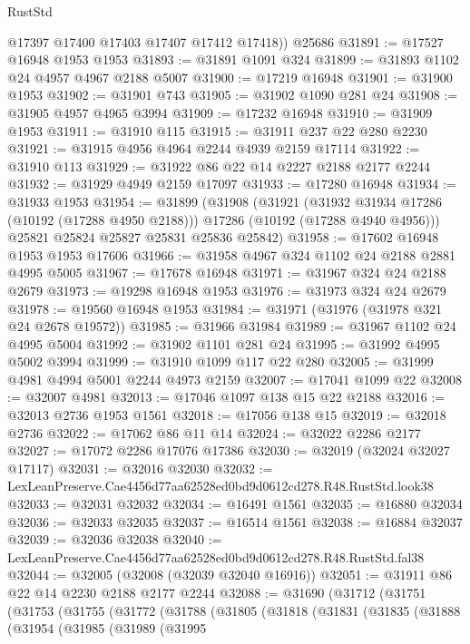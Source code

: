 \begin{lexlean}{RustStd}
\begin{coremodule}
        @17397
        @17400
        @17403
        @17407
        @17412
        @17418))
    @25686
@31891 := @17527 @16948 @1953 @1953
@31893 := @31891 @1091 @324
@31899 := @31893 @1102 @24 @4957 @4967 @2188 @5007
@31900 := @17219 @16948
@31901 := @31900 @1953
@31902 := @31901 @743
@31905 := @31902 @1090 @281 @24
@31908 := @31905 @4957 @4965 @3994
@31909 := @17232 @16948
@31910 := @31909 @1953
@31911 := @31910 @115
@31915 := @31911 @237 @22 @280 @2230
@31921 := @31915 @4956 @4964 @2244 @4939 @2159 @17114
@31922 := @31910 @113
@31929 := @31922 @86 @22 @14 @2227 @2188 @2177 @2244
@31932 := @31929 @4949 @2159 @17097
@31933 := @17280 @16948
@31934 := @31933 @1953
@31954 := @31899
    (@31908
      (@31921
        (@31932 @31934 @17286 (@10192 (@17288 @4950 @2188)))
        @17286
        (@10192 (@17288 @4940 @4956)))
      @25821
      @25824
      @25827
      @25831
      @25836
      @25842)
@31958 := @17602 @16948 @1953 @1953 @17606
@31966 := @31958 @4967 @324 @1102 @24 @2188 @2881 @4995 @5005
@31967 := @17678 @16948
@31971 := @31967 @324 @24 @2188 @2679
@31973 := @19298 @16948 @1953
@31976 := @31973 @324 @24 @2679
@31978 := @19560 @16948 @1953
@31984 := @31971 (@31976 (@31978 @321 @24 @2678 @19572))
@31985 := @31966 @31984
@31989 := @31967 @1102 @24 @4995 @5004
@31992 := @31902 @1101 @281 @24
@31995 := @31992 @4995 @5002 @3994
@31999 := @31910 @1099 @117 @22 @280
@32005 := @31999 @4981 @4994 @5001 @2244 @4973 @2159
@32007 := @17041 @1099 @22
@32008 := @32007 @4981
@32013 := @17046 @1097 @138 @15 @22 @2188
@32016 := @32013 @2736 @1953 @1561
@32018 := @17056 @138 @15
@32019 := @32018 @2736
@32022 := @17062 @86 @11 @14
@32024 := @32022 @2286 @2177
@32027 := @17072 @2286 @17076 @17386
@32030 := @32019 (@32024 @32027 @17117)
@32031 := @32016 @32030
@32032 := LexLeanPreserve.Cae4456d77aa62528ed0bd9d0612cd278.R48.RustStd.look38
@32033 := @32031 @32032
@32034 := @16491 @1561
@32035 := @16880 @32034
@32036 := @32033 @32035
@32037 := @16514 @1561
@32038 := @16884 @32037
@32039 := @32036 @32038
@32040 := LexLeanPreserve.Cae4456d77aa62528ed0bd9d0612cd278.R48.RustStd.fal38
@32044 := @32005 (@32008 (@32039 @32040 @16916))
@32051 := @31911 @86 @22 @14 @2230 @2188 @2177 @2244
@32088 := @31690
    (@31712
      (@31751
        (@31753
          (@31755
            (@31772
              (@31788
                (@31805
                  (@31818
                    (@31831
                      (@31835
                        (@31888
                          (@31954
                            (@31985
                              (@31989
                                (@31995

\end{coremodule}
\end{lexlean}
